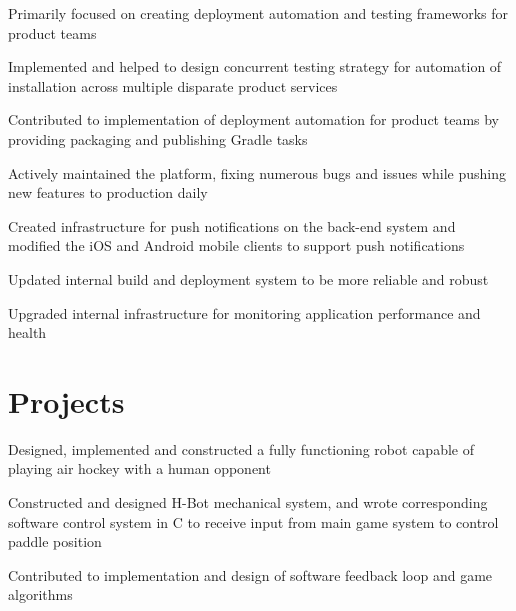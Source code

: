 \documentclass[letterpaper]{deedy-resume} %
\begin{document}
\begin{minipage}[t]{0.66\textwidth}
\begin{tightitemize}
\item Primarily focused on creating deployment automation and testing frameworks for product teams
\item Implemented and helped to design concurrent testing strategy for automation of installation across multiple disparate product services
\item Contributed to implementation of deployment automation for product teams by providing packaging and publishing Gradle tasks
\end{tightitemize}

\sectionspace %



\begin{tightitemize}
\item Actively maintained the platform, fixing numerous bugs and issues while pushing new features to production daily
\item Created infrastructure for push notifications on the back-end system and modified the iOS and Android mobile clients to support push notifications
\item Updated internal build and deployment system to be more reliable and robust
\item Upgraded internal infrastructure for monitoring application performance and health
\end{tightitemize}



\section{Projects}

\begin{tightitemize}
\item Designed, implemented and constructed a fully functioning robot capable of playing air hockey with a human opponent
\item Constructed and designed H-Bot mechanical system, and wrote corresponding software control system in C to receive input from main game system to control paddle position
\item Contributed to implementation and design of software feedback loop and game algorithms
\end{tightitemize}


\end{minipage}
\end{document}

